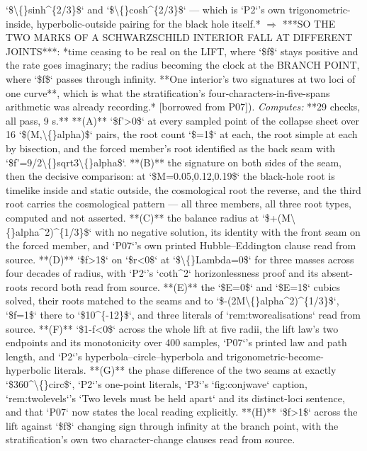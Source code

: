 \begin{description}
`\$\textbackslash\{\}sinh\textasciicircum{}\{2/3\}\$` and `\$\textbackslash\{\}cosh\textasciicircum{}\{2/3\}\$` --- which is `P2`'s own trigonometric-inside, hyperbolic-outside pairing for the black hole itself.* \ensuremath{\Rightarrow} ***SO THE TWO MARKS OF A SCHWARZSCHILD INTERIOR FALL AT DIFFERENT JOINTS***: *time ceasing to be real on the LIFT, where `\$f\$` stays positive and the rate goes imaginary; the radius becoming the clock at the BRANCH POINT, where `\$f\$` passes through infinity. **One interior's two signatures at two loci of one curve**, which is what the stratification's four-characters-in-five-spans arithmetic was already recording.* [borrowed from P07]). 
\emph{Computes:} **29 checks, all pass, 9 s.** **(A)** `\$f'>0\$` at every sampled point of the collapse sheet over 16 `\$(M,\textbackslash\{\}alpha)\$` pairs, the root count `\$=1\$` at each, the root simple at each by bisection, and the forced member's root identified as the back seam with `\$f'=9/2\textbackslash\{\}sqrt3\textbackslash\{\}alpha\$`. **(B)** the signature on both sides of the seam, then the decisive comparison: at `\$M=0.05,0.12,0.19\$` the black-hole root is timelike inside and static outside, the cosmological root the reverse, and the third root carries the cosmological pattern --- all three members, all three root types, computed and not asserted. **(C)** the balance radius at `\$+(M\textbackslash\{\}alpha\textasciicircum{}2)\textasciicircum{}\{1/3\}\$` with no negative solution, its identity with the front seam on the forced member, and `P07`'s own printed Hubble--Eddington clause read from source. **(D)** `\$f>1\$` on `\$r<0\$` at `\$\textbackslash\{\}Lambda=0\$` for three masses across four decades of radius, with `P2`'s `coth\textasciicircum{}2` horizonlessness proof and its absent-roots record both read from source. **(E)** the `\$E=0\$` and `\$E=1\$` cubics solved, their roots matched to the seams and to `\$-(2M\textbackslash\{\}alpha\textasciicircum{}2)\textasciicircum{}\{1/3\}\$`, `\$f=1\$` there to `\$10\textasciicircum{}\{-12\}\$`, and three literals of `rem:tworealisations` read from source. **(F)** `\$1-f<0\$` across the whole lift at five radii, the lift law's two endpoints and its monotonicity over 400 samples, `P07`'s printed law and path length, and `P2`'s hyperbola--circle--hyperbola and trigonometric-become-hyperbolic literals. **(G)** the phase difference of the two seams at exactly `\$360\textasciicircum{}\textbackslash\{\}circ\$`, `P2`'s one-point literals, `P3`'s `fig:conjwave` caption, `rem:twolevels`'s `Two levels must be held apart` and its distinct-loci sentence, and that `P07` now states the local reading explicitly. **(H)** `\$f>1\$` across the lift against `\$f\$` changing sign through infinity at the branch point, with the stratification's own two character-change clauses read from source.

\end{description}
